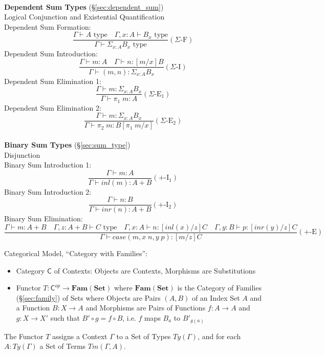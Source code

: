 \hfill \\
\textbf{Dependent Sum Types} (\S\ref{sec:dependent_sum})
\\
Logical Conjunction and Existential Quantification
\\
Dependent Sum Formation:
\[
  \frac{
    \Gamma \vdash A \text{ type} \quad
    \Gamma, x : A \vdash B_x \text{ type}
  }{
    \Gamma \vdash \Sigma_{x:A} B_x \text{ type}
  } (\Sigma\text{-F})
\]
Dependent Sum Introduction:
\[
  \frac{
    \Gamma \vdash m : A \quad
    \Gamma \vdash n : [m/x]B
  }{
    \Gamma \vdash (m,n) : \Sigma_{x:A} B_x
  } (\Sigma\text{-I})
\]
Dependent Sum Elimination 1:
\[
  \frac{
    \Gamma \vdash m : \Sigma_{x:A} B_x
  }{
    \Gamma \vdash \pi_1\;m : A
  } (\Sigma\text{-E$_1$})
\]
Dependent Sum Elimination 2:
\[
  \frac{
    \Gamma \vdash m : \Sigma_{x:A} B_x
  }{
    \Gamma \vdash \pi_2\;m : B[\pi_1\;m/x]
  } (\Sigma\text{-E$_2$})
\]
\hfill \\
\textbf{Binary Sum Types} (\S\ref{sec:sum_type})
\\
Disjunction
\\
Binary Sum Introduction 1:
\[
  \frac{
    \Gamma \vdash m : A
  }{
    \Gamma \vdash inl(m) : A + B
  } (+\text{-I}_1)
\]
Binary Sum Introduction 2:
\[
  \frac{
    \Gamma \vdash n : B
  }{
    \Gamma \vdash inr(n) : A + B
  } (+\text{-I}_2)
\]
Binary Sum Elimination:
\[
  \frac{
    \Gamma \vdash m : A + B \quad
    \Gamma, z : A + B \vdash C \text{ type} \quad
    \Gamma, x : A \vdash n : [inl(x)/z]C \quad
    \Gamma, y : B \vdash p : [inr(y)/z]C
  }{
    \Gamma \vdash case (m, x\;n, y\;p) : [m/z]C
  } (+\text{-E})
\]



Categorical Model, ``Category with Families'':

\begin{itemize}
  \item Category $\mathsf{C}$ of Contexts: Objects are Contexts,
    Morphisms are Substitutions
  \item Functor $T : \mathsf{C}^{op} \rightarrow \mathbf{Fam(Set)}$
    where $\mathbf{Fam(Set)}$ is the Category of Families
    (\S\ref{sec:family}) of Sets where Objects are Pairs $(A,B)$ of an
    Index Set $A$ and a Function $B: X \rightarrow A$ and Morphisms
    are Pairs of Functions $f: A \rightarrow A$ and $g: X \rightarrow
    X'$ such that $B' \circ g = f \circ B$, i.e. $f$ maps $B_a$ to
    $B'_{g(a)}$
\end{itemize}

The Functor $T$ assigns a Context $\Gamma$ to a Set of Types
$Ty(\Gamma)$, and for each $A : Ty(\Gamma)$ a Set of Terms
$Tm(\Gamma,A)$.

